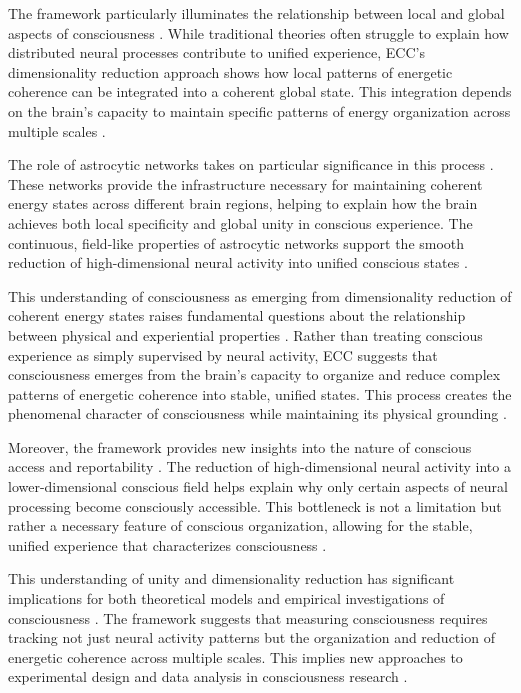 The framework particularly illuminates the relationship between local and global aspects of consciousness \cite{bayne2010unity}. While traditional theories often struggle to explain how distributed neural processes contribute to unified experience, ECC's dimensionality reduction approach shows how local patterns of energetic coherence can be integrated into a coherent global state. This integration depends on the brain's capacity to maintain specific patterns of energy organization across multiple scales \cite{mashour2020conscious}.

The role of astrocytic networks takes on particular significance in this process \cite{koch2017can}. These networks provide the infrastructure necessary for maintaining coherent energy states across different brain regions, helping to explain how the brain achieves both local specificity and global unity in conscious experience. The continuous, field-like properties of astrocytic networks support the smooth reduction of high-dimensional neural activity into unified conscious states \cite{hameroff2014consciousness}.

This understanding of consciousness as emerging from dimensionality reduction of coherent energy states raises fundamental questions about the relationship between physical and experiential properties \cite{tononi2016integrated}. Rather than treating conscious experience as simply supervised by neural activity, ECC suggests that consciousness emerges from the brain's capacity to organize and reduce complex patterns of energetic coherence into stable, unified states. This process creates the phenomenal character of consciousness while maintaining its physical grounding \cite{dehaene2011experimental}.

Moreover, the framework provides new insights into the nature of conscious access and reportability \cite{bayne2003what}. The reduction of high-dimensional neural activity into a lower-dimensional conscious field helps explain why only certain aspects of neural processing become consciously accessible. This bottleneck is not a limitation but rather a necessary feature of conscious organization, allowing for the stable, unified experience that characterizes consciousness \cite{brook2017unity}.

This understanding of unity and dimensionality reduction has significant implications for both theoretical models and empirical investigations of consciousness \cite{tononi2016integrated}. The framework suggests that measuring consciousness requires tracking not just neural activity patterns but the organization and reduction of energetic coherence across multiple scales. This implies new approaches to experimental design and data analysis in consciousness research \cite{dehaene2011experimental}.

